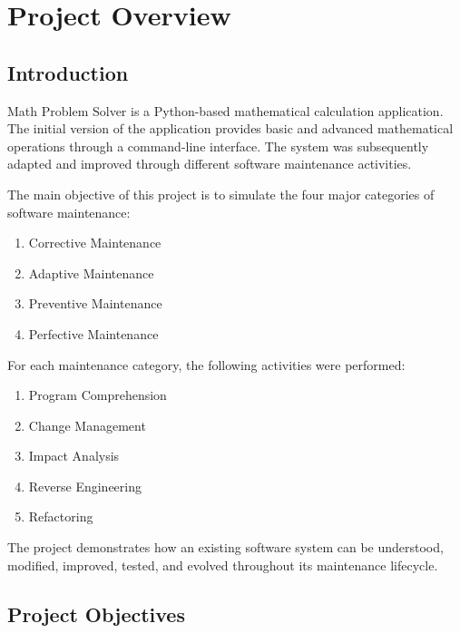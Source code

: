 \documentclass[12pt,a4paper,openany]{report}
\begin{document}


\chapter{Project Overview}

\section{Introduction}

Math Problem Solver is a Python-based mathematical calculation
application. The initial version of the application provides basic and
advanced mathematical operations through a command-line interface.
The system was subsequently adapted and improved through different
software maintenance activities.

The main objective of this project is to simulate the four major
categories of software maintenance:

\begin{enumerate}
    \item Corrective Maintenance
    \item Adaptive Maintenance
    \item Preventive Maintenance
    \item Perfective Maintenance
\end{enumerate}

For each maintenance category, the following activities were performed:

\begin{enumerate}
    \item Program Comprehension
    \item Change Management
    \item Impact Analysis
    \item Reverse Engineering
    \item Refactoring
\end{enumerate}

The project demonstrates how an existing software system can be
understood, modified, improved, tested, and evolved throughout its
maintenance lifecycle.

\section{Project Objectives}
\end{document}
